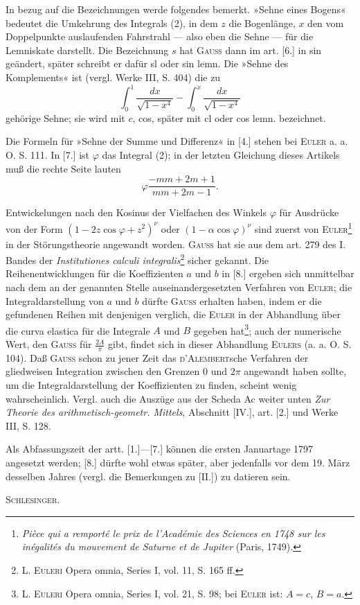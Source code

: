 In bezug auf die Bezeichnungen werde folgendes bemerkt. »Sehne eines Bogens« bedeutet die Umkehrung
des Integrals (2), in dem $z$ die Bogenlänge, $x$ den vom Doppelpunkte auslaufenden Fahrstrahl — also eben die Sehne —
für die Lemniskate darstellt. Die Bezeichnung $s$ hat \textsc{Gauss} dann im art. [6.] in sin geändert, später schreibt er dafür
sl oder sin lemn. Die »Sehne des Komplements« ist (vergl. Werke III, S. 404) die zu
\clearpage
{}
\[\int_0^1\frac{dx}{\sqrt{1-x^4}}-\int_0^x\frac{dx}{\sqrt{1-x^4}}\]
\noindent gehörige Sehne; sie wird mit $c$, cos, später mit cl oder cos lemn. bezeichnet.

Die Formeln für »Sehne der Summe und Differenz« in [4.] stehen bei \textsc{Euler} a. a. O. S. 111. In [7.] ist
$\varphi$ das Integral (2); in der letzten Gleichung dieses Artikels muß die rechte Seite lauten
\[\varphi\frac{-mm+2m+1}{mm+2m-1}.\]

Entwickelungen nach den Kosinus der Vielfachen des Winkels $\varphi$ für Ausdrücke von der Form
$(1-2z\cos\varphi+z^2)^\nu$ oder $(1-\alpha\cos\varphi)^\nu$ sind zuerst von \textsc{Euler}\renewcommand{\thefootnote}{*)}\footnote{\textit{Pièce qui a remporté le prix de l’Académie des Sciences en 1748 sur les inégalités du mouvement de Saturne et de Jupiter} (Paris, 1749).}
in der Störungstheorie angewandt worden. \textsc{Gauss} hat sie aus dem art. 279 des I. Bandes der
\textit{Institutiones calculi integralis}\renewcommand{\thefootnote}{**)}\footnote{L. \textsc{Euleri} Opera omnia, Series I, vol. 11, S. 165 ff.} sicher gekannt.
Die Reihenentwicklungen für die Koeffizienten $a$ und $b$ in [8.] ergeben sich unmittelbar nach dem an der genannten Stelle auseinandergesetzten Verfahren von \textsc{Euler};
die Integraldarstellung von $a$ und $b$ dürfte \textsc{Gauss} erhalten haben, indem er die gefundenen Reihen mit denjenigen verglich, die \textsc{Euler} in der Abhandlung
über die curva elastica für die Integrale $A$ und $B$ gegeben hat\renewcommand{\thefootnote}{***)}\footnote{L. \textsc{Euleri} Opera omnia, Series I, vol. 21, S. 98; bei \textsc{Euler} ist: $A=c$, $B=a$.};
auch der numerische Wert, den \textsc{Gauss} für $\frac{2A}\pi$ gibt, findet sich in dieser Abhandlung \textsc{Eulers} (a. a. O. S. 104).
Daß \textsc{Gauss} schon zu jener Zeit das \textsc{d’Alembert}sche Verfahren der gliedweisen Integration zwischen den Grenzen 0 und $2\pi$ angewandt haben sollte,
um die Integraldarstellung der Koeffizienten zu finden, scheint wenig wahrscheinlich. Vergl. auch die Auszüge aus der Scheda Ac weiter unten
\textit{Zur Theorie des arithmetisch-geometr. Mittels}, Abschnitt [IV.], art. [2.] und Werke III, S. 128.

Als Abfassungszeit der artt. [1.]—[7.] können die ersten Januartage 1797 angesetzt werden; [8.] dürfte wohl etwas später,
aber jedenfalls vor dem 19. März desselben Jahres (vergl. die Bemerkungen zu [II.]) zu datieren sein.
\par\noindent\hfill\textsc{Schlesinger}.\par
\ClosingRule
\clearpage
\endgroup
